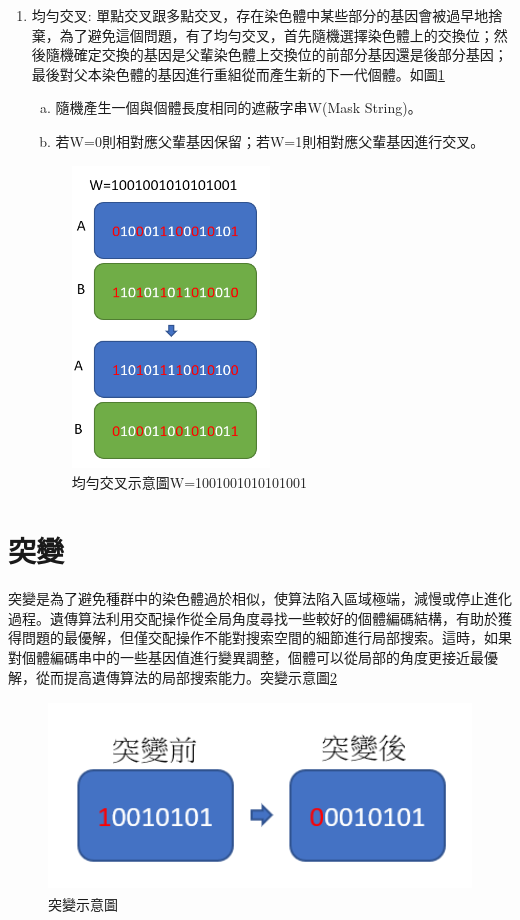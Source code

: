 \begin{enumerate}
	\item
	      均勻交叉:
	      單點交叉跟多點交叉，存在染色體中某些部分的基因會被過早地捨棄，為了避免這個問題，有了均勻交叉，首先隨機選擇染色體上的交換位；然後隨機確定交換的基因是父輩染色體上交換位的前部分基因還是後部分基因；最後對父本染色體的基因進行重組從而產生新的下一代個體。如圖\ref{fig:avg}
	      \begin{enumerate}[(a)]
		      \item
		            隨機產生一個與個體長度相同的遮蔽字串W(Mask String)。

		      \item
		            若W=0則相對應父輩基因保留；若W=1則相對應父輩基因進行交叉。
	      \end{enumerate}
	      \begin{figure}[H]
		      \centerline{\includegraphics[height=8cm]{pic/AVG.PNG}}
		      \caption{均勻交叉示意圖W=1001001010101001}
		      \label{fig:avg}
	      \end{figure}


\end{enumerate}




\section{突變}
突變是為了避免種群中的染色體過於相似，使算法陷入區域極端，減慢或停止進化過程。遺傳算法利用交配操作從全局角度尋找一些較好的個體編碼結構，有助於獲得問題的最優解，但僅交配操作不能對搜索空間的細節進行局部搜索。這時，如果對個體編碼串中的一些基因值進行變異調整，個體可以從局部的角度更接近最優解，從而提高遺傳算法的局部搜索能力。突變示意圖\ref{fig:GAmut}

\begin{figure}[H]
	\centerline{\includegraphics[height=5cm]{pic/GAmut.PNG}}
	\caption{突變示意圖}
	\label{fig:GAmut}
\end{figure}
